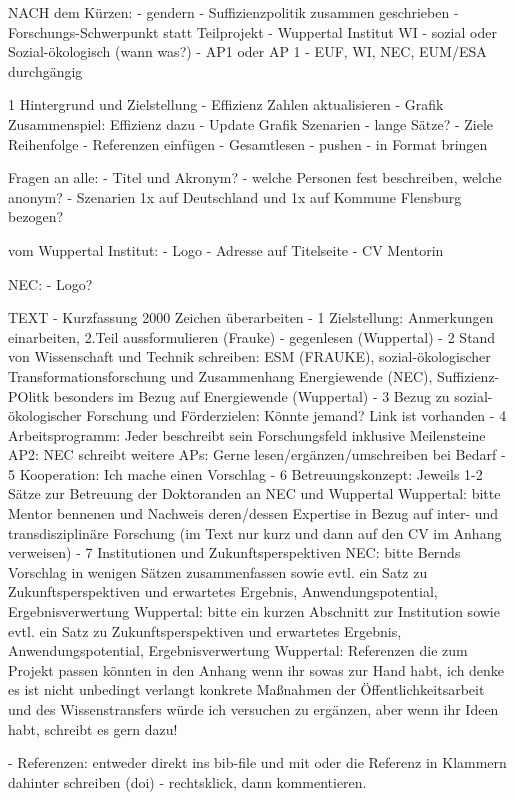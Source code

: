 NACH dem Kürzen:
- gendern
- Suffizienzpolitik zusammen geschrieben
- Forschungs-Schwerpunkt statt Teilprojekt
- Wuppertal Institut WI
- sozial oder Sozial-ökologisch (wann was?)
- AP1 oder AP 1
- EUF, WI, NEC, EUM/ESA durchgängig



1 Hintergrund und Zielstellung
- Effizienz Zahlen aktualisieren
- Grafik Zusammenspiel: Effizienz dazu
- Update Grafik Szenarien
- lange Sätze?
- Ziele Reihenfolge
- Referenzen einfügen
- Gesamtlesen
- pushen
- in Format bringen


Fragen an alle:
- Titel und Akronym?
- welche Personen fest beschreiben, welche anonym?
- Szenarien 1x auf Deutschland und 1x auf Kommune Flensburg bezogen?

vom Wuppertal Institut:
- Logo
- Adresse auf Titelseite
- CV Mentorin


NEC:
- Logo?


TEXT
- Kurzfassung 2000 Zeichen überarbeiten
- 1 Zielstellung: Anmerkungen einarbeiten, 2.Teil aussformulieren (Frauke) - gegenlesen (Wuppertal)
- 2 Stand von Wissenschaft und Technik schreiben: ESM (FRAUKE), sozial-ökologischer Transformationsforschung und Zusammenhang Energiewende (NEC), Suffizienz-POlitk besonders im Bezug auf Energiewende (Wuppertal)
- 3 Bezug zu sozial-ökologischer Forschung und Förderzielen: Könnte jemand? Link ist vorhanden
- 4 Arbeitsprogramm:
Jeder beschreibt sein Forschungsfeld inklusive Meilensteine
AP2: NEC schreibt
weitere APs: Gerne lesen/ergänzen/umschreiben bei Bedarf
- 5 Kooperation: Ich mache einen Vorschlag
- 6 Betreuungskonzept:
Jeweils 1-2 Sätze zur Betreuung der Doktoranden an NEC und Wuppertal
Wuppertal: bitte Mentor bennenen und Nachweis deren/dessen Expertise in Bezug auf inter- und transdisziplinäre Forschung (im Text nur kurz und dann auf den CV im Anhang verweisen)
- 7 Institutionen und Zukunftsperspektiven
NEC: bitte Bernds Vorschlag in wenigen Sätzen zusammenfassen sowie evtl. ein Satz zu Zukunftsperspektiven und erwartetes Ergebnis, Anwendungspotential, Ergebnisverwertung
Wuppertal: bitte ein kurzen Abschnitt zur Institution sowie evtl. ein Satz zu Zukunftsperspektiven und erwartetes Ergebnis, Anwendungspotential, Ergebnisverwertung
Wuppertal: Referenzen die zum Projekt passen könnten in den Anhang wenn ihr sowas zur Hand habt, ich denke es ist nicht unbedingt verlangt
konkrete Maßnahmen der Öffentlichkeitsarbeit und des Wissenstransfers würde ich versuchen zu ergänzen, aber wenn ihr Ideen habt, schreibt es gern dazu!


- Referenzen: entweder direkt ins bib-file und mit \cite{}  oder die Referenz in Klammern dahinter schreiben (doi)
- rechtsklick, dann kommentieren.